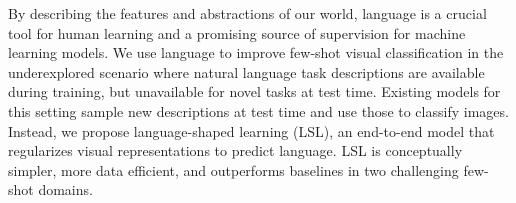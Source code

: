 By describing the features and abstractions of our world, language is a crucial tool for human learning and a promising source of supervision for machine learning models. We use language to improve few-shot visual classification in the underexplored scenario where natural language task descriptions are available during training, but unavailable for novel tasks at test time. Existing models for this setting sample new descriptions at test time and use those to classify images. Instead, we propose language-shaped learning (LSL), an end-to-end model that regularizes visual representations to predict language. LSL is conceptually simpler, more data efficient, and outperforms baselines in two challenging few-shot domains.
